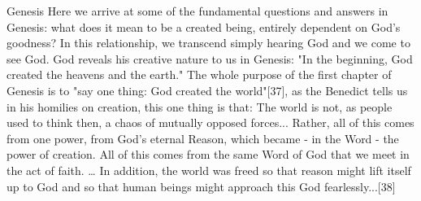 Genesis
Here we arrive at some of the fundamental questions and answers in Genesis: what does it mean to be a created being, entirely dependent on God's goodness? In this relationship, we transcend simply hearing God and we come to see God. God reveals his creative nature to us in Genesis: "In the beginning, God created the heavens and the earth." The whole purpose of the first chapter of Genesis is to "say one thing: God created the world"[37], as the Benedict tells us in his homilies on creation, this one thing is that: 
The world is not, as people used to think then, a chaos of mutually opposed forces... Rather, all of this comes from one power, from God's eternal Reason, which became - in the Word - the power of creation. All of this comes from the same Word of God that we meet in the act of faith. … In addition, the world was freed so that reason might lift itself up to God and so that human beings might approach this God fearlessly...[38]


